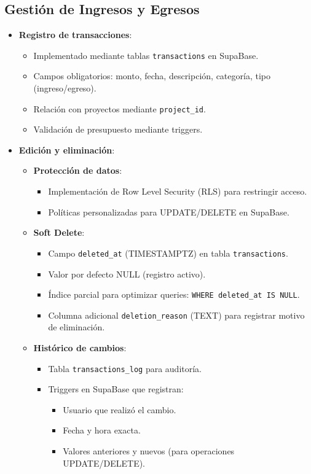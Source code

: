 \subsection{Gestión de Ingresos y Egresos}
\begin{itemize}
    \item \textbf{Registro de transacciones}:
    \begin{itemize}
        \item Implementado mediante tablas \texttt{transactions} en SupaBase.
        \item Campos obligatorios: monto, fecha, descripción, categoría, tipo (ingreso/egreso).
        \item Relación con proyectos mediante \texttt{project\_id}.
        \item Validación de presupuesto mediante triggers.
    \end{itemize}
    
    \item \textbf{Edición y eliminación}:
    \begin{itemize}
        \item \textbf{Protección de datos}:
        \begin{itemize}
            \item Implementación de Row Level Security (RLS) para restringir acceso.
            \item Políticas personalizadas para UPDATE/DELETE en SupaBase.
        \end{itemize}
        
        \item \textbf{Soft Delete}:
        \begin{itemize}
            \item Campo \texttt{deleted\_at} (TIMESTAMPTZ) en tabla \texttt{transactions}.
            \item Valor por defecto NULL (registro activo).
            \item Índice parcial para optimizar queries: \texttt{WHERE deleted\_at IS NULL}.
            \item Columna adicional \texttt{deletion\_reason} (TEXT) para registrar motivo de eliminación.
        \end{itemize}
        
        \item \textbf{Histórico de cambios}:
        \begin{itemize}
            \item Tabla \texttt{transactions\_log} para auditoría.
            \item Triggers en SupaBase que registran:
            \begin{itemize}
                \item Usuario que realizó el cambio.
                \item Fecha y hora exacta.
                \item Valores anteriores y nuevos (para operaciones UPDATE/DELETE).
            \end{itemize}
        \end{itemize}
    \end{itemize}
    

\end{itemize}
